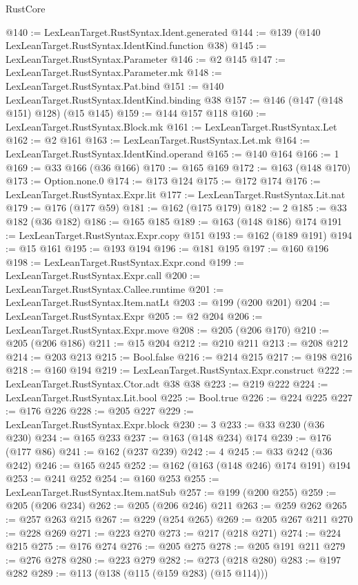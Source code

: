 \begin{lexlean}{RustCore}
\begin{coremodule}
@140 := LexLeanTarget.RustSyntax.Ident.generated
@144 := @139 (@140 LexLeanTarget.RustSyntax.IdentKind.function @38)
@145 := LexLeanTarget.RustSyntax.Parameter
@146 := @2 @145
@147 := LexLeanTarget.RustSyntax.Parameter.mk
@148 := LexLeanTarget.RustSyntax.Pat.bind
@151 := @140 LexLeanTarget.RustSyntax.IdentKind.binding @38
@157 := @146 (@147 (@148 @151) @128) (@15 @145)
@159 := @144 @157 @118
@160 := LexLeanTarget.RustSyntax.Block.mk
@161 := LexLeanTarget.RustSyntax.Let
@162 := @2 @161
@163 := LexLeanTarget.RustSyntax.Let.mk
@164 := LexLeanTarget.RustSyntax.IdentKind.operand
@165 := @140 @164
@166 := 1
@169 := @33 @166 (@36 @166)
@170 := @165 @169
@172 := @163 (@148 @170)
@173 := Option.none.{0}
@174 := @173 @124
@175 := @172 @174
@176 := LexLeanTarget.RustSyntax.Expr.lit
@177 := LexLeanTarget.RustSyntax.Lit.nat
@179 := @176 (@177 @59)
@181 := @162 (@175 @179)
@182 := 2
@185 := @33 @182 (@36 @182)
@186 := @165 @185
@189 := @163 (@148 @186) @174
@191 := LexLeanTarget.RustSyntax.Expr.copy @151
@193 := @162 (@189 @191)
@194 := @15 @161
@195 := @193 @194
@196 := @181 @195
@197 := @160 @196
@198 := LexLeanTarget.RustSyntax.Expr.cond
@199 := LexLeanTarget.RustSyntax.Expr.call
@200 := LexLeanTarget.RustSyntax.Callee.runtime
@201 := LexLeanTarget.RustSyntax.Item.natLt
@203 := @199 (@200 @201)
@204 := LexLeanTarget.RustSyntax.Expr
@205 := @2 @204
@206 := LexLeanTarget.RustSyntax.Expr.move
@208 := @205 (@206 @170)
@210 := @205 (@206 @186)
@211 := @15 @204
@212 := @210 @211
@213 := @208 @212
@214 := @203 @213
@215 := Bool.false
@216 := @214 @215
@217 := @198 @216
@218 := @160 @194
@219 := LexLeanTarget.RustSyntax.Expr.construct
@222 := LexLeanTarget.RustSyntax.Ctor.adt @38 @38
@223 := @219 @222
@224 := LexLeanTarget.RustSyntax.Lit.bool
@225 := Bool.true
@226 := @224 @225
@227 := @176 @226
@228 := @205 @227
@229 := LexLeanTarget.RustSyntax.Expr.block
@230 := 3
@233 := @33 @230 (@36 @230)
@234 := @165 @233
@237 := @163 (@148 @234) @174
@239 := @176 (@177 @86)
@241 := @162 (@237 @239)
@242 := 4
@245 := @33 @242 (@36 @242)
@246 := @165 @245
@252 := @162 (@163 (@148 @246) @174 @191) @194
@253 := @241 @252
@254 := @160 @253
@255 := LexLeanTarget.RustSyntax.Item.natSub
@257 := @199 (@200 @255)
@259 := @205 (@206 @234)
@262 := @205 (@206 @246) @211
@263 := @259 @262
@265 := @257 @263 @215
@267 := @229 (@254 @265)
@269 := @205 @267 @211
@270 := @228 @269
@271 := @223 @270
@273 := @217 (@218 @271)
@274 := @224 @215
@275 := @176 @274
@276 := @205 @275
@278 := @205 @191 @211
@279 := @276 @278
@280 := @223 @279
@282 := @273 (@218 @280)
@283 := @197 @282
@289 := @113 (@138 (@115 (@159 @283) (@15 @114)))

\end{coremodule}
\end{lexlean}

